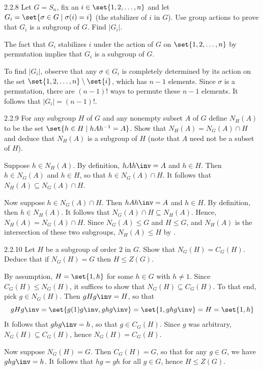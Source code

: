 \begin{exercise}{2.2.8}
    Let $G=S_n$, fix an $i \in \set{1, 2, \dots, n}$ and let $G_i=\set{\sigma\in G\mid\sigma(i)=i}$ (the stabilizer of $i$ in $G$).
	Use group actions to prove that $G_i$ is a subgroup of $G$.
	Find $|G_i|$.
\end{exercise}

\begin{sol}
    The fact that $G_i$ stabilizes $i$ under the action of $G$ on $\set{1, 2, \ldots, n}$ by permutation implies that $G_i$ is a subgroup of $G$.

    To find $|G_i|$, observe that any $\sigma \in G_i$ is completely determined by its action on the set $\set{1, 2, \ldots, n} \setminus \set{i}$, which has $n - 1$ elements.
	Since $\sigma$ is a permutation, there are $(n - 1)!$ ways to permute these $n - 1$ elements.
	It follows that $|G_i| = (n - 1)!$.
\end{sol}

\begin{exercise}{2.2.9}
    For any subgroup $H$ of $G$ and any nonempty subset $A$ of $G$ define $N_H(A)$ to be the set $\set{h \in H \mid hAh^{-1} = A}$.
	Show that $N_H(A) = N_G(A) \cap H$ and deduce that $N_H(A)$ is a subgroup of $H$ (note that $A$ need not be a subset of $H$).
\end{exercise}

\begin{sol}
    Suppose $h \in N_H(A)$.
	By definition, $hAh\inv = A$ and $h \in H$.
	Then $h \in N_G(A)$ and $h \in H$, so that $h \in N_G(A) \cap H$.
	It follows that $N_H(A) \subseteq N_G(A) \cap H$.

    Now suppose $h \in N_G(A) \cap H$.
	Then $hAh\inv = A$ and $h \in H$.
	By definition, then $h \in N_H(A)$.
	It follows that $N_G(A) \cap H \subseteq N_H(A)$.
	Hence, $N_H(A) = N_G(A) \cap H$.
	Since $N_G(A) \leq G$ and $H \leq G$, and $N_H(A)$ is the intersection of these two subgroups, $N_H(A) \leq H$ by .
\end{sol}

\begin{exercise}{2.2.10}
    Let $H$ be a subgroup of order $2$ in $G$.
	Show that $N_G(H) = C_G(H)$.
	Deduce that if $N_G(H) = G$ then $H \le Z(G)$.
\end{exercise}

\begin{sol}
    By assumption, $H = \set{1, h}$ for some $h \in G$ with $h \neq 1$.
	Since $C_G(H) \leq N_G(H)$, it suffices to show that $N_G(H) \subseteq C_G(H)$.
	To that end, pick $g \in N_G(H)$.
	Then $gHg\inv = H$, so that
    \[
    	gHg\inv = \set{g(1)g\inv, g h g\inv} = \set{1, g h g\inv} = H = \set{1, h}
    \]
    It follows that $g h g\inv = h$, so that $g \in C_G(H)$.
	Since $g$ was arbitrary, $N_G(H) \subseteq C_G(H)$, hence $N_G(H) = C_G(H)$.

    Now suppose $N_G(H) = G$.
	Then $C_G(H) = G$, so that for any $g \in G$, we have $g h g\inv = h$.
	It follows that $h g = g h$ for all $g \in G$, hence $H \leq Z(G)$.
\end{sol}

